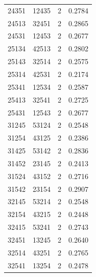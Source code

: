 \begin{tabular}{@{}llrr@{}}
24351&12435&2&0.2784\\
24513&32451&2&0.2865\\
24531&12453&2&0.2677\\
25134&42513&2&0.2802\\
25143&32514&2&0.2575\\
25314&42531&2&0.2174\\
25341&12534&2&0.2587\\
25413&32541&2&0.2725\\
25431&12543&2&0.2677\\
31245&53124&2&0.2548\\
31254&43125&2&0.2386\\
31425&53142&2&0.2836\\
31452&23145&2&0.2413\\
31524&43152&2&0.2716\\
31542&23154&2&0.2907\\
32145&53214&2&0.2548\\
32154&43215&2&0.2448\\
32415&53241&2&0.2743\\
32451&13245&2&0.2640\\
32514&43251&2&0.2765\\
32541&13254&2&0.2478\\
\bottomrule
\end{tabular}
